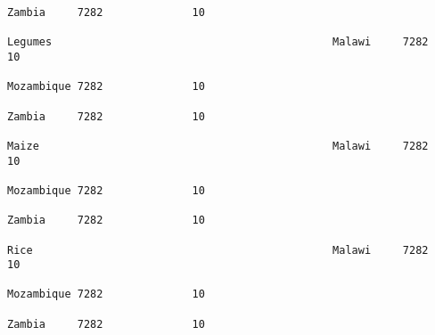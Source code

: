 \documentclass[11pt]{article}
\begin{document}
\begin{Verbatim}[commandchars=\\\{\}]
                                                                                                                                                                                                                 Zambia     7282              10  
                                                                                                                                                              Legumes                                            Malawi     7282              10  
                                                                                                                                                                                                                 Mozambique 7282              10  
                                                                                                                                                                                                                 Zambia     7282              10  
                                                                                                                                                              Maize                                              Malawi     7282              10  
                                                                                                                                                                                                                 Mozambique 7282              10  
                                                                                                                                                                                                                 Zambia     7282              10  
                                                                                                                                                              Rice                                               Malawi     7282              10  
                                                                                                                                                                                                                 Mozambique 7282              10  
                                                                                                                                                                                                                 Zambia     7282              10  
\end{Verbatim}
            

    
    
    
    
\end{document}
